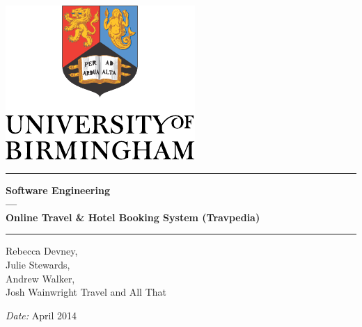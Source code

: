 \begin{titlepage}
	\begin{center}
	\vspace*{\fill}

	\centering
	\includegraphics[scale=1.2]{Logo.pdf}
	\vfill

	\hrule
	{\LARGE\bf Software Engineering \\
		--- \\
		Online Travel \& Hotel Booking System (Travpedia)\\[0.4cm]}
	\hrule

	\vfill

	\vfill
		Rebecca Devney,\\
		Julie Stewards,\\
		Andrew Walker,\\
		Josh Wainwright
	\vfill
	Travel and All That

	\vfill
	\vfill
	\textit{Date:} April 2014
	\vfill
	\vfill

	\end{center}
\end{titlepage}


